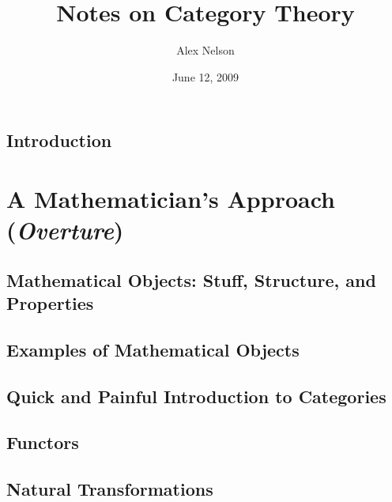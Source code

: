 \documentclass{amsart}
\title{Notes on Category Theory}
\date{June 12, 2009} %
\author{Alex Nelson}
\theoremstyle{plain}
\theoremstyle{definition}
\begin{document}
\maketitle{}
\tableofcontents
\listoftables
\section{Introduction}



\chapter{A Mathematician's Approach (\emph{Overture})}
\section{Mathematical Objects: Stuff, Structure, and Properties}

\section{Examples of Mathematical Objects}

\section{Quick and Painful Introduction to Categories}

\section{Functors}

\section{Natural Transformations}


\end{document}
